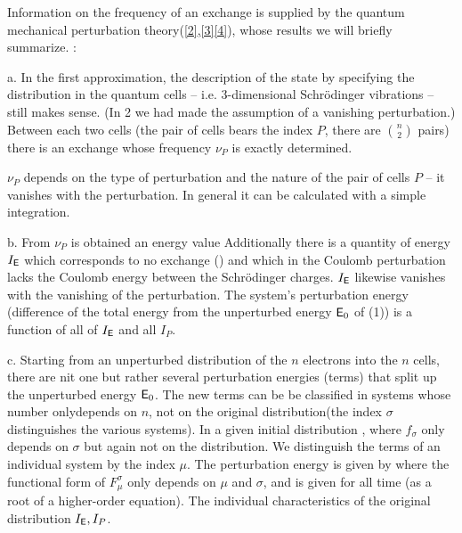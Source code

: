 \begin{paper}{1}
Information on the frequency of an exchange is supplied by the quantum mechanical perturbation theory(\ref{2},\ref{3}\ref{4}), whose results we will briefly summarize. :

a. In the first approximation, the description of the state by specifying the distribution in the quantum cells -- i.e. 3-dimensional Schr\"odinger vibrations -- still makes sense. (In 2 we had made the assumption of a vanishing perturbation.) Between each two cells (the pair of cells bears the index $P$, there are $\binom{n}{2}$ pairs) there is an exchange whose frequency $\nu_P$ is exactly determined.

$\nu_P$ depends on the type of perturbation and the nature of the pair of cells $P$ -- it vanishes with the perturbation. In general it can be calculated with a simple integration.

b. From $\nu_P$ is obtained an energy value
Additionally there is a quantity of energy $I_{\mathsf{E}}$ which corresponds to no exchange () and which in the Coulomb perturbation lacks the Coulomb energy between the Schr\"odinger charges. $I_{\mathsf{E}}$ likewise vanishes with the vanishing of the perturbation. The system's perturbation energy (difference of the total energy from the unperturbed energy $\mathsf{E}_0$ of (1)) is a function of all of $I_{\mathsf{E}}$ and all $I_P$.

c. Starting from an unperturbed distribution of the $n$ electrons into the $n$ cells, there are nit one but rather several perturbation energies (terms) that split up the unperturbed energy $\mathsf{E}_0$. The new terms can be be classified in systems whose number onlydepends on $n$, not on the original distribution(the index $\sigma$ distinguishes the various systems). In a given initial distribution , where $f_\sigma$ only depends on $\sigma$ but again not on the distribution. We distinguish the terms of an individual system by the index $\mu$. The perturbation energy is given by 
where the functional form of $F_\mu^\sigma$ only depends on $\mu$ and $\sigma$, and is given for all time (as a root of a higher-order equation). The individual characteristics of the original distribution  $I_{\mathsf{E}}, I_P$.


\end{paper}
